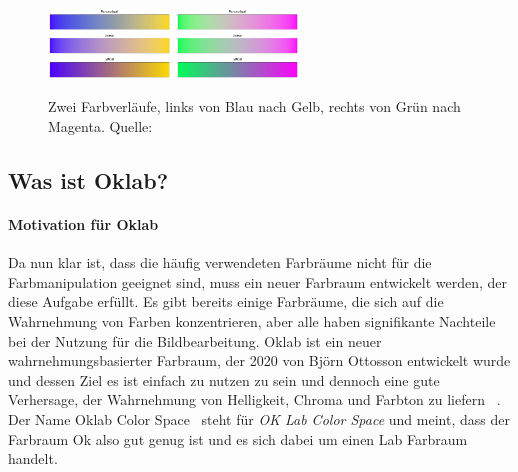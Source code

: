 \documentclass[12pt, a4paper, ngerman]{article}
\begin{document}
\begin{figure}
  \centering
  \includegraphics[width=0.29\textwidth]{Grafiken/Farbverlauf/blueyellow.png}
  \includegraphics[width=0.29\textwidth]{Grafiken/Farbverlauf/greenmagenta.png}
  \caption{Zwei Farbverläufe, links von Blau nach Gelb, rechts von Grün nach Magenta. Quelle: ~\cite{Ottosson_2020}}
  \label{fig:vergleich_zweifarbig}
\end{figure}

\subsection{Was ist Oklab?}

\paragraph{Motivation für Oklab}
Da nun klar ist, dass die häufig verwendeten Farbräume nicht für die Farbmanipulation geeignet sind, 
muss ein neuer Farbraum entwickelt werden, der diese Aufgabe erfüllt.
Es gibt bereits einige Farbräume, die sich auf die Wahrnehmung von Farben konzentrieren, 
aber alle haben signifikante Nachteile bei der Nutzung für die Bildbearbeitung.
Oklab ist ein neuer wahrnehmungsbasierter Farbraum, der 2020 von Björn Ottosson entwickelt wurde und 
dessen Ziel es ist einfach zu nutzen zu sein und dennoch eine gute Verhersage, 
der  Wahrnehmung von Helligkeit, Chroma und Farbton zu liefern ~\cite{Oklab_2020}.
Der Name \glqq Oklab Color Space\grqq~ steht für \emph{OK Lab Color Space} und meint, 
dass der Farbraum Ok also gut genug ist und es sich dabei um einen Lab Farbraum handelt.
\end{document}
